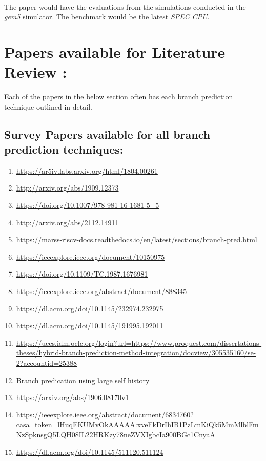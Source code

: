 \documentclass[12pt]{article}
\begin{document}
\paragraph*{}
The paper would have the evaluations from the simulations conducted in the \emph{gem5} simulator. The benchmark would be the latest \emph{SPEC CPU}. 

\section*{Papers available for Literature Review :}
Each of the papers in the below section often has each branch prediction technique outlined in detail. 
\subsection*{Survey Papers available for all branch prediction techniques:}
\begin{enumerate}
    \item \url{https://ar5iv.labs.arxiv.org/html/1804.00261}
    \item \url{http://arxiv.org/abs/1909.12373}
    \item \url{https://doi.org/10.1007/978-981-16-1681-5_5}
    \item \url{http://arxiv.org/abs/2112.14911}
    \item \url{https://marss-riscv-docs.readthedocs.io/en/latest/sections/branch-pred.html}
    \item \url{https://ieeexplore.ieee.org/document/10150975}
    \item \url{https://doi.org/10.1109/TC.1987.1676981}
    \item \url{https://ieeexplore.ieee.org/abstract/document/888345}
    \item \url{https://dl.acm.org/doi/10.1145/232974.232975}
    \item \url{https://dl.acm.org/doi/10.1145/191995.192011}
    \item \url{https://uccs.idm.oclc.org/login?url=https://www.proquest.com/dissertations-theses/hybrid-branch-prediction-method-integration/docview/305535160/se-2?accountid=25388}
    \item \url{Branch predication using large self history}
    \item \url{https://arxiv.org/abs/1906.08170v1}
    \item \url{https://ieeexplore.ieee.org/abstract/document/6834760?casa_token=lHuqEKUMvOkAAAAA:xveFkDrIhIB1PzLmKiQk5MmMlblFmNzSpknsgQ5LQH08IL22HRKzy78neZVXIgbcIa900BGc1CnyaA}
    \item \url{https://dl.acm.org/doi/10.1145/511120.511124}
\end{enumerate}
\end{document}
